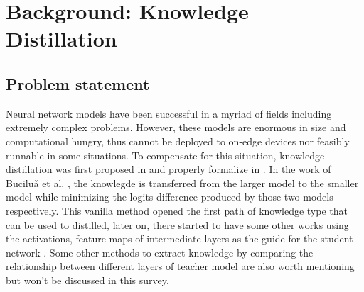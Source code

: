 \section{Background: Knowledge Distillation}

\subsection{Problem statement}
Neural network models have been successful in a myriad of fields including extremely complex problems. However, these models are enormous in size and computational hungry, thus cannot be deployed to on-edge devices nor feasibly runnable in some situations. To compensate for this situation, knowledge distillation was first proposed in \cite{firstkdpaper} and properly formalize in \cite{hintonfirstkd}. In the work of Buciluǎ et al. \cite{firstkdpaper}, the knowlegde is transferred from the larger model to the smaller model while minimizing the logits difference produced by those two models respectively. This vanilla method opened the first path of knowledge type that can be used to distilled, later on, there started to have some other works using the activations, feature maps of intermediate layers as the guide for the student network \cite{featurebased01, featurebased02_AT,featurebased03_relu}. Some other methods to extract knowledge by comparing the relationship between different layers of teacher model \cite{relbase01, relbase02} are also worth mentioning but won't be discussed in this survey.
